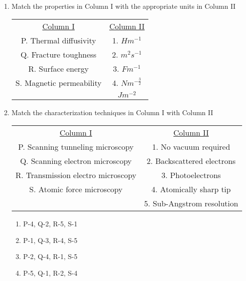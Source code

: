 \documentclass[journal]{IEEEtran}
\begin{document}
\begin{enumerate}[start=10]

\item %
Match the properties in Column I with the appropriate units in Column II \\
\begin{tabular}{c c}
\underline{Column I} & \underline{Column II} \\
P. Thermal diffusivity & 1. $Hm^{-1}$ \\
Q. Fracture toughness & 2. $m^2s^{-1}$ \\
R. Surface energy & 3. $Fm^{-1}$ \\
S. Magnetic permeability & 4. $Nm^{-\frac{3}{2}}$ \\
 & $Jm^{-2}$ 
 \end{tabular}
\begin{enumerate}
\end{enumerate}

\item %
Match the characterization techniques in Column I with Column II \\
\begin{tabular}{c c}
\underline{Column I} & \underline{Column II} \\
P. Scanning tunneling microscopy & 1. No vacuum required \\
Q. Scanning electron microscopy & 2. Backscattered electrons \\
R. Transmission electro microscopy & 3. Photoelectrons \\
S. Atomic force microscopy & 4. Atomically sharp tip\\
& 5.  Sub-Angstrom resolution \\
\end{tabular}
\begin{multicols}{2}
    \begin{enumerate}
        \item P-4, Q-2, R-5, S-1
        \item P-1, Q-3, R-4, S-5
        \item P-2, Q-4, R-1, S-5
        \item P-5, Q-1, R-2, S-4
    \end{enumerate}
\end{multicols}


\end{enumerate}
\end{document}

